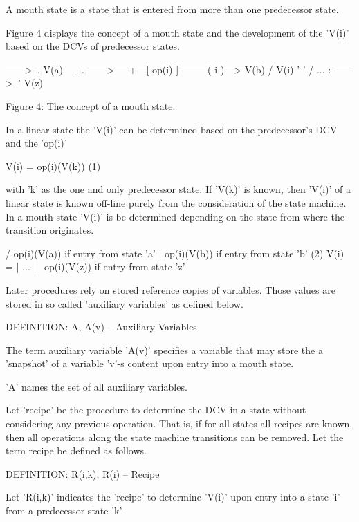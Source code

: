 \documentclass[12pt]{article}
\begin{document}
    A mouth state is a state that is entered from more than one predecessor 
    state. 
    
Figure 4 displays the concept of a mouth state and the development of the
'V(i)' based on the DCVs of predecessor states.

                  ------>--.  
                 V(a)       \ 
                             \                       .-.
                  ------>-----+---[ op(i) ]---------( i )---> 
                 V(b)        /                 V(i)  '-'
                            /
                 ...       :
                  ------>--'
                 V(z)

                    Figure 4: The concept of a mouth state.

In a linear state the 'V(i)' can be determined based on the predecessor's
DCV and the 'op(i)'

            V(i) = op(i)(V(k))                                          (1)

with 'k' as the one and only predecessor state. If 'V(k)' is known, then
'V(i)' of a linear state is known off-line purely from the consideration of
the state machine.  In a mouth state 'V(i)' is be determined depending on the
state from where the transition originates.

                    /  op(i)(V(a))  if entry from state 'a'
                    |  op(i)(V(b))  if entry from state 'b'             (2)
            V(i) =  |   ...
                    |  
                    \  op(i)(V(z))  if entry from state 'z'

Later procedures rely on stored reference copies of variables. Those values
are stored in so called 'auxiliary variables' as defined below.

DEFINITION: A, A(v) -- Auxiliary Variables

   The term auxiliary variable 'A(v)' specifies a variable that may store the
   a 'snapshot' of a variable 'v'-s content upon entry into a mouth state. 
   
   'A' names the set of all auxiliary variables.

Let 'recipe' be the procedure to determine the DCV in a state without
considering any previous operation. That is, if for all states all recipes are
known, then all operations along the state machine transitions can be removed.
Let the term recipe be defined as follows.

DEFINITION: R(i,k), R(i) -- Recipe 

   Let 'R(i,k)' indicates the 'recipe' to determine 'V(i)' upon entry into a
   state 'i' from a predecessor state 'k'.  
   
\end{document}
